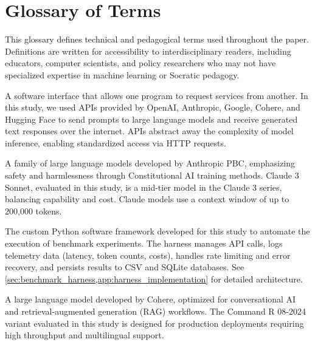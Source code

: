 \section{Glossary of Terms}\label{app:glossary}

This glossary defines technical and pedagogical terms used throughout the paper. Definitions are written for accessibility to interdisciplinary readers, including educators, computer scientists, and policy researchers who may not have specialized expertise in machine learning or Socratic pedagogy.

\begin{description}[style=nextline,leftmargin=0em,itemsep=1em]

\item[\textbf{API (Application Programming Interface)}] A software interface that allows one program to request services from another. In this study, we used APIs provided by OpenAI, Anthropic, Google, Cohere, and Hugging Face to send prompts to large language models and receive generated text responses over the internet. APIs abstract away the complexity of model inference, enabling standardized access via HTTP requests.

\item[\textbf{Anthropic Claude}] A family of large language models developed by Anthropic PBC, emphasizing safety and harmlessness through Constitutional AI training methods. Claude 3 Sonnet, evaluated in this study, is a mid-tier model in the Claude 3 series, balancing capability and cost. Claude models use a context window of up to 200,000 tokens.

\item[\textbf{Benchmark Harness}] The custom Python software framework developed for this study to automate the execution of benchmark experiments. The harness manages API calls, logs telemetry data (latency, token counts, costs), handles rate limiting and error recovery, and persists results to CSV and SQLite databases. See \cref{sec:benchmark_harness,app:harness_implementation} for detailed architecture.

\item[\textbf{Cohere Command R}] A large language model developed by Cohere, optimized for conversational AI and retrieval-augmented generation (RAG) workflows. The Command R 08-2024 variant evaluated in this study is designed for production deployments requiring high throughput and multilingual support.


\end{description}

